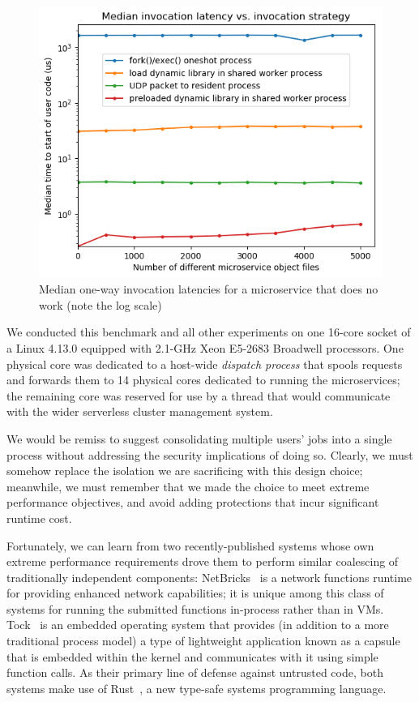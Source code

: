 \begin{figure}
\includegraphics[width=\columnwidth]{figs/2018-02-02-motivation_numfuns-latency-reordered}
\caption{Median one-way invocation latencies for a microservice that does no work (note the log scale)}
\label{fig:motive}
\end{figure}

We conducted this benchmark and all other experiments on one 16-core socket of a
Linux 4.13.0 equipped with 2.1-GHz Xeon E5-2683 Broadwell processors.  One physical
core was dedicated to a host-wide \textit{dispatch process} that spools requests and
forwards them to 14 physical cores dedicated to running the microservices; the
remaining core was reserved for use by a thread that would communicate with the wider
serverless cluster management system.

We would be remiss to suggest consolidating multiple users' jobs into a single
process without addressing the security implications of doing so.  Clearly, we must
somehow replace the isolation we are sacrificing with this design choice; meanwhile,
we must remember that we made the choice to meet extreme performance objectives, and
avoid adding protections that incur significant runtime cost.

Fortunately, we can learn from two recently-published systems whose own extreme
performance requirements drove them to perform similar coalescing of traditionally
independent components:  NetBricks~\cite{Panda2016} is a network functions runtime
for providing enhanced network capabilities; it is unique among this class of
systems for running the submitted functions in-process rather than in VMs.
Tock~\cite{Levy2017} is an embedded operating system that provides (in addition to a
more traditional process model) a type of lightweight application known as a capsule
that is embedded within the kernel and communicates with it using simple function
calls.  As their primary line of defense against untrusted code, both systems make
use of Rust~\cite{www-rustlang}, a new type-safe systems programming language.

